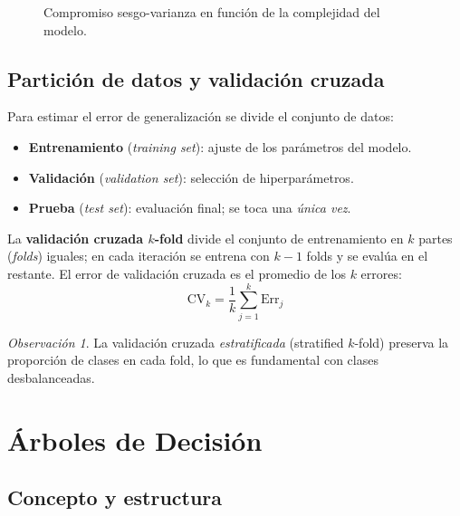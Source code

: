 \documentclass[12pt, a4paper]{article}
\theoremstyle{definition}
\theoremstyle{plain}
\theoremstyle{remark}
\newtheorem{observacion}{Observación}[section]
\begin{document}
\begin{figure}[H]
  \centering
  \caption{Compromiso sesgo-varianza en función de la complejidad del modelo.}
\end{figure}

\subsection{Partición de datos y validación cruzada}

Para estimar el error de generalización se divide el conjunto de datos:

\begin{itemize}
  \item \textbf{Entrenamiento} (\textit{training set}): ajuste de los parámetros del modelo.
  \item \textbf{Validación} (\textit{validation set}): selección de hiperparámetros.
  \item \textbf{Prueba} (\textit{test set}): evaluación final; se toca una \emph{única vez}.
\end{itemize}

La \textbf{validación cruzada $k$-fold} divide el conjunto de entrenamiento en $k$ partes (\textit{folds}) iguales; en cada iteración se entrena con $k-1$ folds y se evalúa en el restante. El error de validación cruzada es el promedio de los $k$ errores:
\[
  \text{CV}_k = \frac{1}{k} \sum_{j=1}^{k} \text{Err}_j
\]

\begin{observacion}
  La validación cruzada \emph{estratificada} (stratified $k$-fold) preserva la proporción de clases en cada fold, lo que es fundamental con clases desbalanceadas.
\end{observacion}

\section{Árboles de Decisión}

\subsection{Concepto y estructura}
\end{document}
